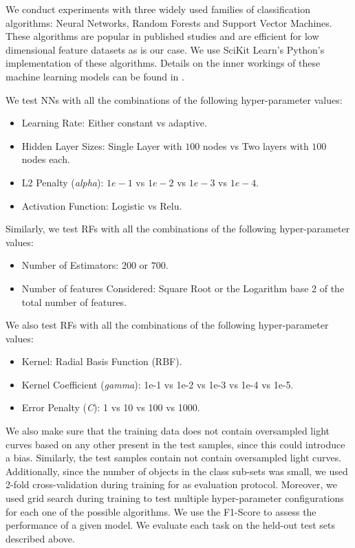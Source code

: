\documentclass[a4paper,fleqn,usenatbib]{mnras}
\begin{document}
We conduct experiments with three widely used families of classification 
algorithms: Neural Networks, Random Forests and Support Vector Machines.
These algorithms are popular in published studies and are efficient 
for low dimensional feature datasets as is our case. 
We use SciKit Learn's \citep{1201.0490} Python's implementation of these algorithms.
Details on the inner workings of these machine learning models can be
found in \cite{9780387848570}.  

We test NNs with all the combinations of the following hyper-parameter values:
\begin{itemize}
    \item Learning Rate: Either constant vs adaptive.
    \item Hidden Layer Sizes: Single Layer with $100$ nodes vs Two layers with
    $100$ nodes each.
    \item L2 Penalty (\textit{alpha}): $1e-1$ vs $1e-2$ vs $1e-3$ vs $1e-4$.
    \item Activation Function: Logistic vs Relu.
\end{itemize}

Similarly, we test RFs with all the combinations of the following 
hyper-parameter values:
\begin{itemize}
    \item Number of Estimators: $200$ or $700$.
    \item Number of features Considered: Square Root or the Logarithm 
    base 2 of the total number of features.
\end{itemize}

We also test RFs with all the combinations of the following hyper-parameter values:
\begin{itemize}
    \item Kernel: Radial Basis Function (RBF).
    \item Kernel Coefficient (\textit{gamma}): 1e-1 vs 1e-2 vs 1e-3 vs 1e-4 vs 1e-5.
    \item Error Penalty (\textit{C}): 1 vs 10 vs 100 vs 1000. 
\end{itemize}

We also make sure that the training data does not contain oversampled
light curves based on any other present in the test samples, since
this could introduce a bias.  
Similarly, the test samples contain not contain oversampled light
curves.
Additionally, since the number of objects in the class sub-sets was
small, we used 2-fold cross-validation during training for as evaluation
protocol. 
Moreover, we used grid search during training to test multiple
hyper-parameter configurations for each one  of the possible
algorithms. 
We use the F1-Score to assess the performance of a given model.
We evaluate each task on the held-out test sets described above.
\end{document}
